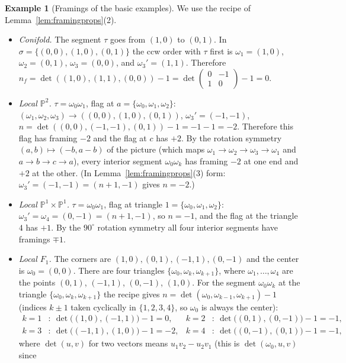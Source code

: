 \documentclass[11pt]{article}
\theoremstyle{plain}
\theoremstyle{definition}
\newtheorem{example}[theorem]{Example}
\theoremstyle{remark}
\newcommand{\PP}{\mathbb{P}}
\begin{document}
\begin{example}[Framings of the basic examples]\label{ex:framings}
We use the recipe of Lemma~\ref{lem:framingprops}(2).
\begin{itemize}
\item \textit{Conifold.} The segment $\tau$ goes from $(1,0)$ to $(0,1)$. In
$\sigma=\{(0,0),(1,0),(0,1)\}$ the ccw order with $\tau$ first is $\omega_1=(1,0)$,
$\omega_2=(0,1)$, $\omega_3=(0,0)$, and $\omega_3'=(1,1)$. Therefore
$n_f=\det((1,0),(1,1),(0,0))-1=\det\left(\begin{smallmatrix}0&-1\\1&0\end{smallmatrix}\right)-1=0$.
\item \textit{Local $\PP^2$.} $\tau=\omega_0\omega_1$, flag at $a=\{\omega_0,\omega_1,\omega_2\}$:
$(\omega_1,\omega_2,\omega_3)\rightarrow((0,0),(1,0),(0,1))$, $\omega_3'=(-1,-1)$,
$n=\det((0,0),(-1,-1),(0,1))-1=-1-1=-2$. Therefore this flag has framing $-2$ and the flag at $c$ has
$+2$. By the rotation symmetry $(a,b)\mapsto(-b,a-b)$ of the picture (which maps
$\omega_1\rightarrow\omega_2\rightarrow\omega_3\rightarrow\omega_1$ and $a\rightarrow b\rightarrow c\rightarrow a$), every interior segment
$\omega_0\omega_k$ has framing $-2$ at one end and $+2$ at the other. (In
Lemma~\ref{lem:framingprops}(3) form: $\omega_3'=(-1,-1)=(n+1,-1)$ gives $n=-2$.)
\item \textit{Local $\PP^1\times\PP^1$.} $\tau=\omega_0\omega_1$, flag at triangle
$1=\{\omega_0,\omega_1,\omega_2\}$: $\omega_3'=\omega_4=(0,-1)=(n+1,-1)$, so $n=-1$, and the flag at the
triangle $4$ has $+1$. By the $90^\circ$ rotation symmetry all four interior segments have
framings $\mp1$.
\item \textit{Local $F_1$.} The corners are $(1,0),(0,1),(-1,1),(0,-1)$ and the center is
$\omega_0=(0,0)$. There are four triangles $\{\omega_0,\omega_k,\omega_{k+1}\}$, where
$\omega_1,\ldots,\omega_4$ are the points $(0,1)$, $(-1,1)$, $(0,-1)$, $(1,0)$.
For the segment $\omega_0\omega_k$ at the triangle $\{\omega_0,\omega_k,\omega_{k+1}\}$ the recipe
gives $n=\det(\omega_0,\omega_{k-1},\omega_{k+1})-1$ (indices $k\pm1$ taken cyclically in
$\{1,2,3,4\}$, so $\omega_0$ is always the center):
\begin{align}
k=1&:\ \det\big((1,0),(-1,1)\big)-1=0, & k=2&:\ \det\big((0,1),(0,-1)\big)-1=-1,\\
k=3&:\ \det\big((-1,1),(1,0)\big)-1=-2, & k=4&:\ \det\big((0,-1),(0,1)\big)-1=-1,
\end{align}
where $\det(u,v)$ for two vectors means $u_1v_2-u_2v_1$ (this is $\det(\omega_0,u,v)$ since

\end{itemize}
\end{example}
\end{document}
